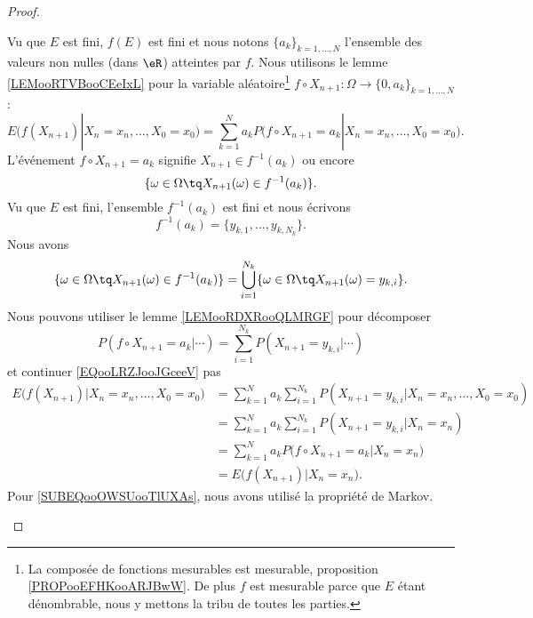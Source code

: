 \begin{proof}
\begin{subproof}
		Vu que \( E\) est fini, \( f(E)\) est fini et nous notons \( \{a_k \}_{k=1,\ldots, N}\) l'ensemble des valeurs non nulles (dans \( \eR\)) atteintes par \( f\). Nous utilisons le lemme \ref{LEMooRTVBooCEeIxL} pour la variable aléatoire\footnote{La composée de fonctions mesurables est mesurable, proposition \ref{PROPooEFHKooARJBwW}. De plus \( f\) est mesurable parce que \( E\) étant dénombrable, nous y mettons la tribu de toutes les parties.} \( f\circ X_{n+1}\colon \Omega\to \{ 0,a_k \}_{k=1,\ldots,N}\) :
		\begin{equation}    \label{EQooLRZJooJGceeV}
			E\big( f(X_{n+1})|X_n=x_n,\ldots, X_0=x_0 \big)=\sum_{k=1}^{N}a_kP\big( f\circ X_{n+1}=a_k|X_n=x_n,\ldots, X_0=x_0 \big).
		\end{equation}
		L'événement \( f\circ X_{n+1}=a_k\) signifie \( X_{n+1}\in f^{-1}(a_k)\) ou encore
		\begin{equation}
			\{ \omega\in \Omega\tq X_{n+1}(\omega)\in f^{-1}(a_k) \}.
		\end{equation}
		Vu que \( E\) est fini, l'ensemble \( f^{-1}(a_k)\) est fini et nous écrivons
		\begin{equation}
			f^{-1}(a_k)=\{ y_{k,1},\ldots, y_{k,N_k} \}.
		\end{equation}
		Nous avons
		\begin{equation}
			\{ \omega\in \Omega\tq X_{n+1}(\omega)\in f^{-1}(a_k) \}=\bigcup_{i=1}^{N_k}\{ \omega\in \Omega\tq X_{n+1}(\omega)=y_{k,i} \}.
		\end{equation}
		Nous pouvons utiliser le lemme \ref{LEMooRDXRooQLMRGF} pour décomposer
		\begin{equation}
			P(f\circ X_{n+1}=a_k|\cdots)=\sum_{i=1}^{N_k}P(X_{n+1}=y_{k,i}|\cdots)
		\end{equation}
		et continuer \eqref{EQooLRZJooJGceeV} pas
		\begin{subequations}
			\begin{align}
				E\big( f(X_{n+1})|X_n=x_n,\ldots, X_0=x_0 \big) & =\sum_{k=1}^Na_k\sum_{i=1}^{N_k}P(X_{n+1}=y_{k,i}|X_n=x_n,\ldots, X_0=x_0)                 \\
				                                                & =\sum_{k=1}^Na_k\sum_{i=1}^{N_k}P(X_{n+1}=y_{k,i}|X_n=x_n)     \label{SUBEQooOWSUooTlUXAs} \\
				                                                & =\sum_{k=1}^Na_kP\big( f\circ X_{n+1}=a_k|X_n=x_n \big)                                    \\
				                                                & =E\big( f(X_{n+1})|X_n=x_n \big).
			\end{align}
		\end{subequations}
		Pour \eqref{SUBEQooOWSUooTlUXAs}, nous avons utilisé la propriété de Markov.
	\end{subproof}
\end{proof}

